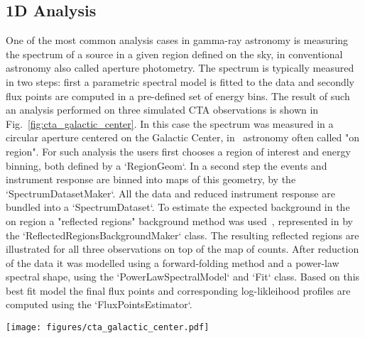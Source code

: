 \subsection{1D Analysis}
\label{ssec:1d-analysis}
One of the most common analysis cases in gamma-ray astronomy is measuring the
spectrum of a source in a given region defined on the sky, in conventional
astronomy also called aperture photometry. The spectrum is typically measured
in two steps: first a parametric spectral model is fitted to the data and
secondly flux points are computed in a pre-defined set of energy bins. The
result of such an analysis performed on three simulated CTA observations is
shown in Fig.~\ref{fig:cta_galactic_center}. In this case the spectrum was
measured in a circular aperture centered on the Galactic Center, in
\gammaray~astronomy often called "on region". For such analysis the users first
chooses a region of interest and energy binning, both defined by a
`RegionGeom`. In a second step the events and instrument response are binned
into maps of this geometry, by the `SpectrumDatasetMaker`. All the data and
reduced instrument response are bundled into a `SpectrumDataset`. To estimate
the expected background in the on region a "reflected regions" background
method was used~\cite{Berge07}, represented in \gammapy by the
`ReflectedRegionsBackgroundMaker` class. The resulting reflected regions are
illustrated for all three observations on top of the map of counts. After
reduction of the data it was modelled using a forward-folding method and a
power-law spectral shape, using the `PowerLawSpectralModel` and `Fit` class.
Based on this best fit model the final flux points and corresponding
log-likleihood profiles are computed using the `FluxPointsEstimator`.

\begin{figure*}[t]
	\centering
	\texttt{[image: figures/cta\_galactic\_center.pdf]}
	\caption{
		Example spectral analysis of the Galactic Center for three simulated CTA
		observations. The left image shows the maps of counts with the measurement
		region and background regions overlaid in different colors. The right image
		shows the resulting spectral points and their corresponding log-likelihood
		profiles. } \label{fig:cta_galactic_center} \end{figure*}

